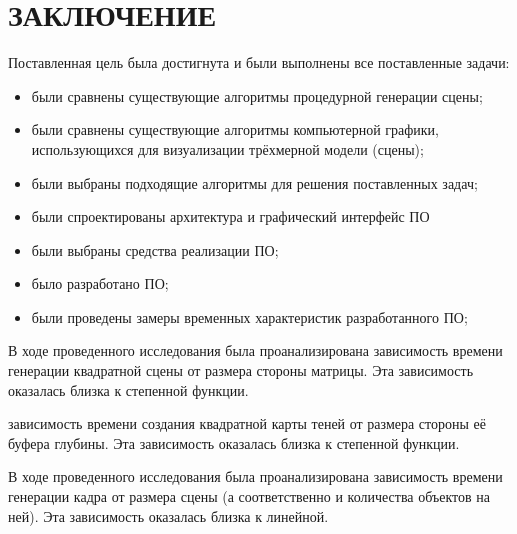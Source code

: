\chapter{ЗАКЛЮЧЕНИЕ}

Поставленная цель была достигнута и были выполнены все поставленные задачи:
\begin{itemize}
  \item были сравнены существующие алгоритмы процедурной генерации сцены;
  \item были сравнены существующие алгоритмы компьютерной графики, использующихся для визуализации трёхмерной модели (сцены);
  \item были выбраны подходящие алгоритмы для решения поставленных задач;
  \item были спроектированы архитектура и графический интерфейс ПО
  \item были выбраны средства реализации ПО;
  \item было разработано ПО;
  \item были проведены замеры временных характеристик разработанного ПО;
\end{itemize}

В ходе проведенного исследования была проанализирована зависимость времени генерации квадратной сцены от размера стороны матрицы. Эта зависимость оказалась близка к степенной функции.

зависимость времени создания квадратной карты теней от размера стороны её буфера глубины. Эта зависимость оказалась близка к степенной функции.

В ходе проведенного исследования была проанализирована зависимость времени генерации кадра от размера сцены (а соответственно и количества объектов на ней). Эта зависимость оказалась близка к линейной.
